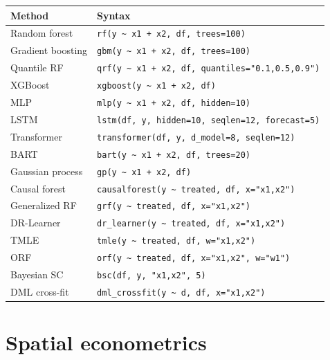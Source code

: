\begin{center}
\begin{tabular}{ll}
\toprule
\textbf{Method} & \textbf{Syntax} \\
\midrule
Random forest       & \texttt{rf(y \textasciitilde{} x1 + x2, df, trees=100)} \\
Gradient boosting   & \texttt{gbm(y \textasciitilde{} x1 + x2, df, trees=100)} \\
Quantile RF         & \texttt{qrf(y \textasciitilde{} x1 + x2, df, quantiles="0.1,0.5,0.9")} \\
XGBoost             & \texttt{xgboost(y \textasciitilde{} x1 + x2, df)} \\
MLP                 & \texttt{mlp(y \textasciitilde{} x1 + x2, df, hidden=10)} \\
LSTM\textdagger{}                & \texttt{lstm(df, y, hidden=10, seqlen=12, forecast=5)} \\
Transformer\textdagger{}         & \texttt{transformer(df, y, d\_model=8, seqlen=12)} \\
BART                & \texttt{bart(y \textasciitilde{} x1 + x2, df, trees=20)} \\
Gaussian process    & \texttt{gp(y \textasciitilde{} x1 + x2, df)} \\
\midrule
Causal forest       & \texttt{causalforest(y \textasciitilde{} treated, df, x="x1,x2")} \\
Generalized RF      & \texttt{grf(y \textasciitilde{} treated, df, x="x1,x2")} \\
DR-Learner          & \texttt{dr\_learner(y \textasciitilde{} treated, df, x="x1,x2")} \\
TMLE                & \texttt{tmle(y \textasciitilde{} treated, df, w="x1,x2")} \\
ORF                 & \texttt{orf(y \textasciitilde{} treated, df, x="x1,x2", w="w1")} \\
Bayesian SC         & \texttt{bsc(df, y, "x1,x2", 5)} \\
DML cross-fit       & \texttt{dml\_crossfit(y \textasciitilde{} d, df, x="x1,x2")} \\
\bottomrule
\end{tabular}
\end{center}

\section{Spatial econometrics}

